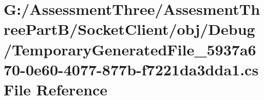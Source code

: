 \hypertarget{_socket_client_2obj_2_debug_2_temporary_generated_file__5937a670-0e60-4077-877b-f7221da3dda1_8cs}{}\section{G\+:/\+Assessment\+Three/\+Assesment\+Three\+Part\+B/\+Socket\+Client/obj/\+Debug/\+Temporary\+Generated\+File\+\_\+5937a670-\/0e60-\/4077-\/877b-\/f7221da3dda1.cs File Reference}
\label{_socket_client_2obj_2_debug_2_temporary_generated_file__5937a670-0e60-4077-877b-f7221da3dda1_8cs}
